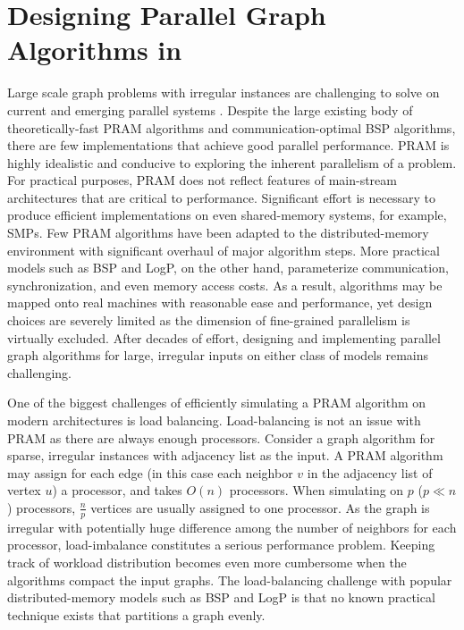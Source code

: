 
\section{Designing Parallel Graph Algorithms in \Xten{}}
\label{s:design}


 Large scale graph problems with irregular instances are challenging to solve on current and emerging parallel systems \cite{BC07}. Despite the large existing body of theoretically-fast PRAM algorithms and communication-optimal BSP algorithms, there are few implementations that achieve good parallel performance.
PRAM is highly idealistic and conducive to exploring the inherent parallelism of a problem. For practical purposes, PRAM does not reflect features of main-stream architectures that are critical to performance. Significant effort is necessary to produce efficient implementations on even shared-memory systems, for example, SMPs. Few PRAM algorithms have been adapted to the distributed-memory environment with significant overhaul of major algorithm steps. More practical models such as BSP and LogP, on the other hand, parameterize communication, synchronization, and even memory access costs. As a result, algorithms may be mapped onto real machines with reasonable ease and performance, yet design choices are severely limited as the dimension of fine-grained parallelism is virtually excluded. After decades of effort, designing and implementing parallel graph algorithms for large, irregular inputs on either class of models remains challenging. 

 One of the biggest challenges of efficiently simulating a PRAM algorithm on modern architectures is load balancing. Load-balancing is not an issue with PRAM as there are always enough processors. Consider a graph algorithm for sparse, irregular instances with adjacency list as the input. A PRAM algorithm may assign for each edge (in this case each neighbor $v$ in the adjacency list of vertex $u$) a processor, and takes $O(n)$ processors. When simulating on $p$ ($p\ll n$) processors, $\frac{n}{p}$ vertices are usually assigned to one processor. As the graph is irregular with potentially huge difference among the number of neighbors for each processor, load-imbalance constitutes a serious performance problem. Keeping track of workload distribution becomes even more cumbersome when the algorithms compact the input graphs. The load-balancing challenge with popular distributed-memory models such as BSP and LogP is that no known practical technique exists that partitions a graph evenly.

